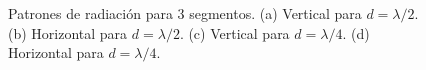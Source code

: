 \documentclass[11pt]{report}
\begin{document}
\begin{figure}[h!]
	\caption{Patrones de radiación para 3 segmentos.
	(a) Vertical para $d =\lambda/2$.
	(b) Horizontal para $d=\lambda/2$.
	(c) Vertical para $d=\lambda/4$.
	(d) Horizontal para $d=\lambda/4$.}
\end{figure}
\end{document}

